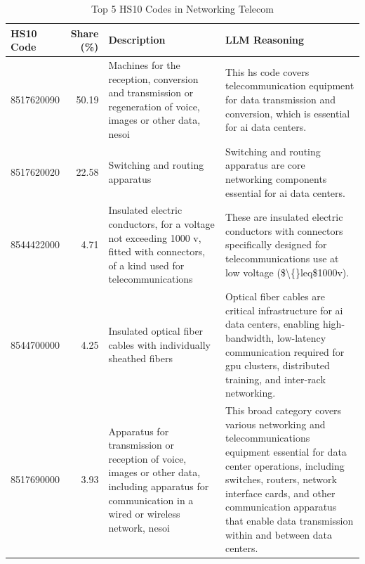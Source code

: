 \begin{table}[htbp]
\centering
\caption{Top 5 HS10 Codes in Networking Telecom}
\label{tab:top5_networking_telecom}
\begin{tabular}{lrp{5.5cm}p{5.5cm}}
\toprule
HS10 Code & Share (\%) & Description & LLM Reasoning \\
\midrule
8517620090 & 50.19 & {\footnotesize Machines for the reception, conversion and transmission or regeneration of voice, images or other data, nesoi} & {\footnotesize This hs code covers telecommunication equipment for data transmission and conversion, which is essential for ai data centers.} \\
8517620020 & 22.58 & {\footnotesize Switching and routing apparatus} & {\footnotesize Switching and routing apparatus are core networking components essential for ai data centers.} \\
8544422000 & 4.71 & {\footnotesize Insulated electric conductors, for a voltage not exceeding 1000 v, fitted with connectors, of a kind used for telecommunications} & {\footnotesize These are insulated electric conductors with connectors specifically designed for telecommunications use at low voltage (\$\textbackslash\{\}leq\$1000v).} \\
8544700000 & 4.25 & {\footnotesize Insulated optical fiber cables with individually sheathed fibers} & {\footnotesize Optical fiber cables are critical infrastructure for ai data centers, enabling high-bandwidth, low-latency communication required for gpu clusters, distributed training, and inter-rack networking.} \\
8517690000 & 3.93 & {\footnotesize Apparatus for transmission or reception of voice, images or other data, including apparatus for communication in a wired or wireless network, nesoi} & {\footnotesize This broad category covers various networking and telecommunications equipment essential for data center operations, including switches, routers, network interface cards, and other communication apparatus that enable data transmission within and between data centers.} \\
\bottomrule
\end{tabular}
\end{table}
